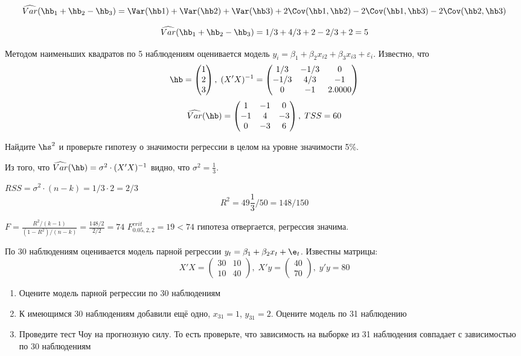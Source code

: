 \documentclass[pdftex,11pt,openany]{book}\usepackage[]{graphicx}\usepackage[]{color}
\begin{document}
\begin{solution}
\[\widehat{Var}(\hb_1+\hb_2-\hb_3)=\Var(\hb1)+\Var(\hb2)+\Var(\hb3)+
2\Cov(\hb1,\hb2)-2\Cov(\hb1,\hb3)-2\Cov(\hb2,\hb3)\]

\[\widehat{Var}(\hb_1+\hb_2-\hb_3)=1/3+4/3+2-2/3+2=5\]
\end{solution}

\begin{problem}
Методом наименьших квадратов по 5 наблюдениям оценивается модель $y_i=\beta_1+\beta_2 x_{i2}+\beta_3 x_{i3}+\varepsilon_i$. Известно, что
\[
\hb=\begin{pmatrix}
1 \\
2 \\
3
\end{pmatrix}, \;
(X'X)^{-1}= \begin{pmatrix} 
1/3 & -1/3 & 0 \\ 
-1/3 & 4/3 & -1 \\ 
0 & -1 & 2.0000 
\end{pmatrix}
\]
\[
\widehat{Var}(\hb)=\begin{pmatrix}
1 & -1 & 0 \\
-1 & 4 & -3 \\ 
0 & -3 & 6
\end{pmatrix}, \; TSS=60
\]

Найдите $\hs^2$ и проверьте гипотезу о значимости регрессии в целом на уровне значимости 5\%.
\end{problem}

\begin{solution}
Из того, что $\widehat{Var}(\hb)=\sigma^2\cdot (X'X)^{-1}$ видно, что $\sigma^2=\frac13$.

$RSS=\sigma^2\cdot(n-k)=1/3\cdot 2=2/3$
\[R^2=49\frac13/50=148/150\]


$F=\frac{R^2/(k-1)}{(1-R^2)/(n-k)}=\frac{148/2}{2/2}=74$
$F^{crit}_{0.05, 2,2}=19<74$
гипотеза отвергается, регрессия значима.

\end{solution}



\begin{problem}
По 30 наблюдениям оценивается модель парной регрессии $y_t=\beta_1 + \beta_2 x_t + \e_t$. Известны матрицы:
\[
X'X=\begin{pmatrix}
30 & 10 \\
10 & 40
\end{pmatrix}, \;
X'y=\begin{pmatrix}
40 \\
70 
\end{pmatrix}, \;
y'y=80
\]

\begin{enumerate}
\item Оцените модель парной регрессии по 30 наблюдениям
\item К имеющимся 30 наблюдениям добавили ещё одно, $x_{31}=1$, $y_{31}=2$. Оцените модель по 31 наблюдению
\item Проведите тест Чоу на прогнозную силу. То есть проверьте, что зависимость на выборке из  31 наблюдения совпадает с зависимостью по 30 наблюдениям
\end{enumerate}
\end{problem}
\end{document}
